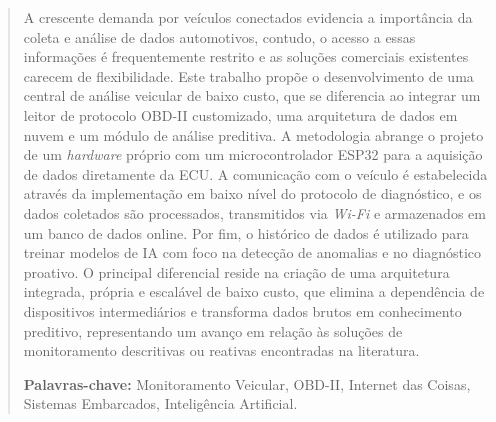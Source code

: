 \documentclass[a4paper, 12pt]{article}
\begin{document}
\clearpage %
\pagestyle{empty} 
\setcounter{page}{0}
\begin{abstract}

A crescente demanda por veículos conectados evidencia a importância da coleta e análise de dados automotivos, contudo, o acesso a essas informações é frequentemente restrito e as soluções comerciais existentes carecem de flexibilidade. Este trabalho propõe o desenvolvimento de uma central de análise veicular de baixo custo, que se diferencia ao integrar um leitor de protocolo OBD-II customizado, uma arquitetura de dados em nuvem e um módulo de análise preditiva. A metodologia abrange o projeto de um \textit{hardware} próprio com um microcontrolador ESP32 para a aquisição de dados diretamente da ECU. A comunicação com o veículo é estabelecida através da implementação em baixo nível do protocolo de diagnóstico, e os dados coletados são processados, transmitidos via \textit{Wi-Fi} e armazenados em um banco de dados online. Por fim, o histórico de dados é utilizado para treinar modelos de IA com foco na detecção de anomalias e no diagnóstico proativo. O principal diferencial reside na criação de uma arquitetura integrada, própria e escalável de baixo custo, que elimina a dependência de dispositivos intermediários e transforma dados brutos em conhecimento preditivo, representando um avanço em relação às soluções de monitoramento descritivas ou reativas encontradas na literatura.

\vspace{\baselineskip}
\noindent
\textbf{Palavras-chave:} Monitoramento Veicular, OBD-II, Internet das Coisas, Sistemas Embarcados, Inteligência Artificial.
\end{abstract}

\clearpage

\printglossary[type=\acronymtype, title={Lista de Siglas e Abreviaturas}]
\setcounter{page}{0}
\clearpage


\tableofcontents %
\setcounter{page}{0}
\clearpage

\end{document}
